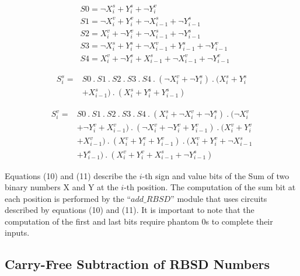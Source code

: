 \documentclass[conference]{IEEEtran_IBSS}
\begin{document}
\vspace{-1em}
\begin{align}
&S0 = \neg X_{i}^{s} + Y_{i}^{s} + \neg Y_{i}^{v}\\
&S1 = \neg X_{i}^{v} + Y_{i}^{v} + \neg X_{i-1}^{s} + \neg Y_{i-1}^{s}\\
&S2 = X_{i}^{v} + \neg Y_{i}^{v} + \neg X_{i-1}^{s} + \neg Y_{i-1}^{s}\\
&S3 = \neg X_{i}^{s} + Y_{i}^{s} + \neg X_{i-1}^{v} + Y_{i-1}^{s} + \neg Y_{i-1}^{v}\\
&S4 = X_{i}^{v} + \neg Y_{i}^{s} + X_{i-1}^{s} + \neg X_{i-1}^{v} + \neg Y_{i-1}^{v}
\end{align}

\vspace{-1em}
\begin{equation}
\begin{aligned}
S_{i}^s ={} &S0 \ . \ S1 \ . \ S2 \ . \ S3 \ . \ S4 \ . \ (\neg X_{i}^{v} + \neg Y_{i}^{s}) \ . \ (X_{i}^{s} + Y_{i}^{s} \\
&+ X_{i-1}^{s}) \ . \ (X_{i}^{s} + Y_{i}^{s} + Y_{i-1}^{s})
\end{aligned}
\end{equation}

\vspace{-1em}
\begin{equation}
\begin{aligned}
S_{i}^v ={} &S0 \ . \ S1 \ . \ S2 \ . \ S3 \ . \ S4 \ . \ (X_{i}^{s} + \neg X_{i}^{v} + \neg Y_{i}^{s}) \ . \ (\neg X_{i}^{v} \\
&+ \neg Y_{i}^{v} + X_{i-1}^{v}) \ . \ (\neg X_{i}^{v} + \neg Y_{i}^{v} + Y_{i-1}^{v}) \ . \ (X_{i}^{v} + Y_{i}^{v} \\
&+ X_{i-1}^{v}) \ . \ (X_{i}^{v} + Y_{i}^{v} + Y_{i-1}^{v}) \ . \ (X_{i}^{v} + Y_{i}^{v} + \neg X_{i-1}^{s} \\
&+ Y_{i-1}^{s}) \ . \ (X_{i}^{v} + Y_{i}^{v} + X_{i-1}^{s} + \neg Y_{i-1}^{s})
\end{aligned}
\end{equation}

Equations (10) and (11) describe the $i$-th sign and value bits of the Sum of two binary numbers X and Y at the $i$-th position. The computation of the sum bit at each position is performed by the ``$add\_RBSD$'' module that uses circuits described by equations (10) and (11). It is important to note that the computation of the first and last bits require phantom 0s to complete their inputs.

\subsection{Carry-Free Subtraction of RBSD Numbers}
\end{document}
